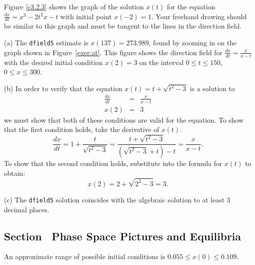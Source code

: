 \documentclass{ximera}
\begin{document}
Figure \ref{c3.2.3} shows the graph of the solution $x(t)$ for the
equation $\frac{dx}{dt} = x^3 - 2t^2x - t$ with initial point $x(-2) = 1$.
Your freehand drawing should be similar to this graph and must be
tangent to the lines in the direction field.

\begin{figure}[htb]
                       \centerline{%
                       }
\end{figure}

(a) The {\tt dfield5} estimate is $x(137) = 273.989$, found by zooming
in on the graph shown in Figure~\ref{exer:at}.  This figure shows the
direction field for $\frac{dx}{dt} = \frac{x}{x - t}$ with the desired
initial condition $x(2) = 3$ on the interval $0 \leq t \leq 150$, $0
\leq x \leq 300$.

(b) In order to verify that the equation $x(t) = t + \sqrt{t^2 - 3}$
is a solution to
\[
\begin{array}{rcl}
\frac{dx}{dt} & = & \frac{x}{x - t} \\
x(2) & = & 3\end{array}
\]
we must show that both of these conditions are valid for the equation.
To show that the first condition holds, take the derivative of $x(t)$.
\[
\frac{dx}{dt} = 1 + \frac{t}{\sqrt{t^2 - 3}} = \frac{t + {\sqrt{t^2 - 
3}}}{\left({\sqrt{t^2 - 3}} + t\right) - t} = \frac{x}{x - t}.
\]
To show that the second condition holds, substitute into the formula for
$x(t)$ to obtain:
\[ x(2) = 2 + \sqrt{2^2 - 3} = 3. \]

(c) The {\tt dfield5} solution coincides with the algebraic solution to at
least 3 decimal places.

\begin{figure}[htb]
                       \centerline{%
                       }
\end{figure}



\subsection*{Section~\protect{\ref{S:PSP&E}} Phase Space Pictures and Equilibria}

\ans An approximate range of possible initial conditions is
$0.055 \leq x(0) \leq 0.109$. 
\end{document}
